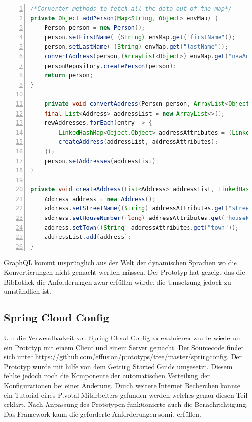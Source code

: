 \begin{lstlisting}[language=Java, showspaces=false, basicstyle=\ttfamily, numbers=left, numberstyle=\tiny, commentstyle=\color{gray}]
/*Converter methods to fetch all the data out of the map*/
private Object addPerson(Map<String, Object> envMap) {
	Person person = new Person();
	person.setFirstName( (String) envMap.get("firstName"));
	person.setLastName( (String) envMap.get("lastName"));
	convertAddress(person,(ArrayList<Object>) envMap.get("newAddresses"));
	personRepository.createPerson(person);
	return person;
}

	private void convertAddress(Person person, ArrayList<Object> newAddresses) {
	final List<Address> addressList = new ArrayList<>();
	newAddresses.forEach(entry -> {
		LinkedHashMap<Object,Object> addressAttributes = (LinkedHashMap<Object,Object>) entry;
		createAddress(addressList, addressAttributes);
	});
	person.setAddresses(addressList);
}

private void createAddress(List<Address> addressList, LinkedHashMap<Object,Object> addressAttributes) {
	Address address = new Address();
	address.setStreetName((String) addressAttributes.get("streetName"));
	address.setHouseNumber((long) addressAttributes.get("houseNumber"));
	address.setTown((String) addressAttributes.get("town"));
	addressList.add(address);
}
\end{lstlisting}
GraphQL kommt ursprünglich aus der Welt der dynamischen Sprachen wo die Konvertierungen nicht gemacht werden müssen. Der Prototyp hat gezeigt das die Bibliothek die Anforderungen zwar erfüllen würde, die Umsetzung jedoch zu umständlich ist.

\subsection{Spring Cloud Config}

Um die Verwendbarkeit von Spring Cloud Config zu evaluieren wurde wiederum ein Prototyp mit einem Client und einem Server gemacht. Der Sourcecode findet sich unter \url{https://github.com/effusion/prototyps/tree/master/springconfig}. Der Prototyp wurde mit hilfe von dem Getting Started Guide \cite{gsspringcloudconfig} umgesetzt. Diesem fehlte jedoch noch die Komponente der automatischen Verteilung der Konfigurationen bei einer Änderung. Durch weitere Internet Recherchen konnte ein Tutorial \cite{springcloudpush} eines Pivotal Mitarbeiters gefunden werden welches genau diesen Teil erklärt. Nach Anpassung des Prototypen funktionierte auch die Benachrichtigung.
Das Framework kann die geforderte Anforderungen somit erfüllen.

